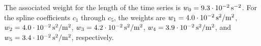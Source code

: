 The associated weight for the length of the time series is $w_0=\unit[9.3 \cdot 10^{-2}]{s^{-2}}$.
For the spline coefficients $c_1$ through $c_{5}$, the weights are $w_{1}=\unit[4.0 \cdot 10^{-2}]{s^2/m^2}$, $w_{2}=\unit[4.0 \cdot 10^{-2}]{s^2/m^2}$, $w_{3}=\unit[4.2 \cdot 10^{-2}]{s^2/m^2}$, $w_{4}=\unit[3.9 \cdot 10^{-2}]{s^2/m^2}$, and $w_{5}=\unit[3.4 \cdot 10^{-2}]{s^2/m^2}$, respectively.